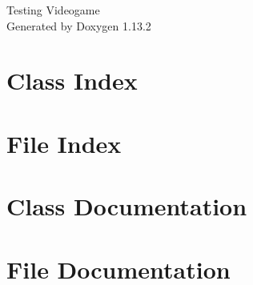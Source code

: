 \documentclass[twoside]{book}
\newcommand{\+}{\discretionary{\mbox{\scriptsize$\hookleftarrow$}}{}{}}
\newcommand{\clearemptydoublepage}{%
    \newpage{\pagestyle{empty}\cleardoublepage}%
  }
\begin{document}
  \raggedbottom
    \hypersetup{pageanchor=false,
                bookmarksnumbered=true,
                pdfencoding=unicode
               }
  \begin{titlepage}
  \vspace*{7cm}
  \begin{center}%
  {\Large Testing Videogame}\\
  \vspace*{1cm}
  {\large Generated by Doxygen 1.13.2}\\
  \end{center}
  \end{titlepage}
  \clearemptydoublepage
  \tableofcontents
  \clearemptydoublepage
  \hypersetup{pageanchor=true}

\chapter{Class Index}

\chapter{File Index}

\chapter{Class Documentation}

\chapter{File Documentation}


  \backmatter
  \newpage
  \clearemptydoublepage
  \printindex
\end{document}
